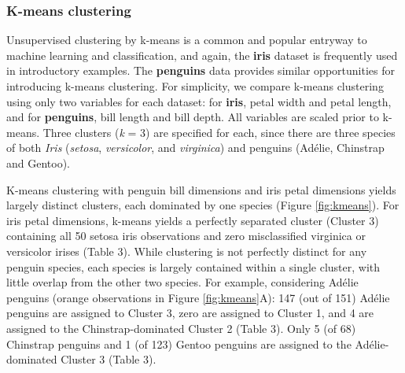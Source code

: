 \hypertarget{k-means-clustering}{%
\subsubsection{K-means clustering}\label{k-means-clustering}}

Unsupervised clustering by k-means is a common and popular entryway to
machine learning and classification, and again, the \textbf{iris}
dataset is frequently used in introductory examples. The
\textbf{penguins} data provides similar opportunities for introducing
k-means clustering. For simplicity, we compare k-means clustering using
only two variables for each dataset: for \textbf{iris}, petal width and
petal length, and for \textbf{penguins}, bill length and bill depth. All
variables are scaled prior to k-means. Three clusters (\emph{k} = 3) are
specified for each, since there are three species of both \emph{Iris}
(\emph{setosa}, \emph{versicolor}, and \emph{virginica}) and penguins
(Adélie, Chinstrap and Gentoo).

K-means clustering with penguin bill dimensions and iris petal
dimensions yields largely distinct clusters, each dominated by one
species (Figure \ref{fig:kmeans}). For iris petal dimensions, k-means
yields a perfectly separated cluster (Cluster 3) containing all 50
setosa iris observations and zero misclassified virginica or versicolor
irises (Table 3). While clustering is not perfectly distinct for any
penguin species, each species is largely contained within a single
cluster, with little overlap from the other two species. For example,
considering Adélie penguins (orange observations in Figure
\ref{fig:kmeans}A): 147 (out of 151) Adélie penguins are assigned to
Cluster 3, zero are assigned to Cluster 1, and 4 are assigned to the
Chinstrap-dominated Cluster 2 (Table 3). Only 5 (of 68) Chinstrap
penguins and 1 (of 123) Gentoo penguins are assigned to the
Adélie-dominated Cluster 3 (Table 3).

